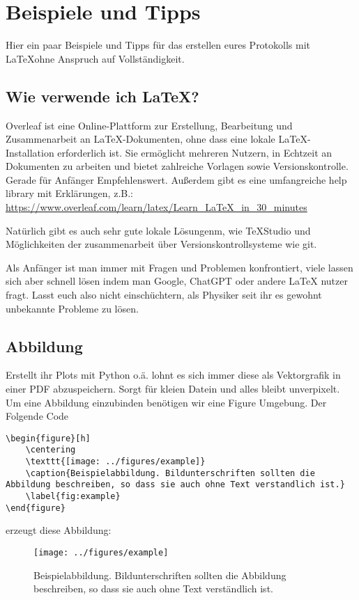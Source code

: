 \documentclass[twoside, 11pt, ngerman, a4paper, biblography=totoc]{article}
\begin{document}
\section{Beispiele und Tipps}
Hier ein paar Beispiele und Tipps für das erstellen eures Protokolls mit \LaTeX ohne Anspruch auf Vollständigkeit.

\subsection{Wie verwende ich LaTeX?}
Overleaf ist eine Online-Plattform zur Erstellung, Bearbeitung und Zusammenarbeit an LaTeX-Dokumenten, ohne dass eine lokale LaTeX-Installation erforderlich ist. Sie ermöglicht mehreren Nutzern, in Echtzeit an Dokumenten zu arbeiten und bietet zahlreiche Vorlagen sowie Versionskontrolle. Gerade für Anfänger Empfehlenswert. Außerdem gibt es eine umfangreiche help library mit Erklärungen, z.B.: \href{https://www.overleaf.com/learn/latex/Learn\_LaTeX_in_30_minutes}{https://www.overleaf.com/learn/latex/Learn\_LaTeX\_in\_30\_minutes}

Natürlich gibt es auch sehr gute lokale Lösungenm, wie TeXStudio und Möglichkeiten der zusammenarbeit über Versionskontrollsysteme wie git.

Als Anfänger ist man immer mit Fragen und Problemen konfrontiert, viele lassen sich aber schnell lösen indem man Google, ChatGPT oder andere LaTeX nutzer fragt. Lasst euch also nicht einschüchtern, als Physiker seit ihr es gewohnt unbekannte Probleme zu lösen.

\subsection{Abbildung}
Erstellt ihr Plots mit Python o.ä. lohnt es sich immer diese als Vektorgrafik in einer PDF abzuspeichern. Sorgt für kleien Datein und alles bleibt unverpixelt.
Um eine Abbildung einzubinden benötigen wir eine Figure Umgebung. Der Folgende Code
\begin{lstlisting}[language=Tex]
\begin{figure}[h]
    \centering
    \texttt{[image: ../figures/example]}
    \caption{Beispielabbildung. Bildunterschriften sollten die Abbildung beschreiben, so dass sie auch ohne Text verstandlich ist.}
    \label{fig:example}
\end{figure}
\end{lstlisting}
erzeugt diese Abbildung:
\begin{figure}[H]
    \centering
    \texttt{[image: ../figures/example]}
    \caption{Beispielabbildung. Bildunterschriften sollten die Abbildung beschreiben, so dass sie auch ohne Text verständlich ist.}
    \label{fig:example}
\end{figure}
\end{document}
